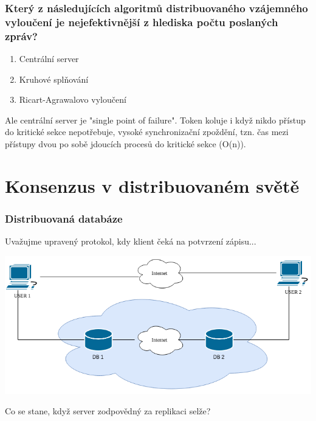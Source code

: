 \documentclass[usenames,dvipsnames,9pt]{beamer}
\begin{document}
{  \begin{frame}[fragile]
  \frametitle{Který z následujících algoritmů distribuovaného vzájemného vyloučení je nejefektivnější z hlediska počtu poslaných zpráv?}
  \begin{enumerate}
    \item Centrální server 
    \item Kruhové splňování 
    \item Ricart-Agrawalovo vyloučení 
  \end{enumerate}
  \vspace{2em}
  \begin{overprint}[\textwidth]
     Ale centrální server je "single point of failure".
     Token koluje i když nikdo přístup do kritické sekce nepotřebuje, vysoké synchronizační zpoždění, tzn. čas mezi přístupy dvou po sobě jdoucích procesů do kritické sekce (O(n)).
  \end{overprint}
  \end{frame}

}

\section{Konsenzus v distribuovaném světě}

\begin{frame}
  \frametitle{Distribuovaná databáze}

  {\large Uvažujme upravený protokol, kdy klient čeká na potvrzení zápisu...}

  \begin{center}
    \includegraphics[width=0.8\linewidth]{12/figs/pdv_cloud.png}
  \end{center}

  \pause
  \begin{center}
    \Large Co se stane, když server zodpovědný za replikaci selže?
  \end{center}
\end{frame}
\end{document}
